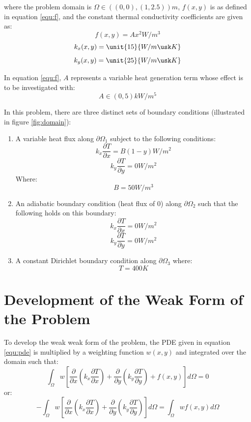 \documentclass[letterpaper,10pt]{article}
\begin{document}
\noindent where the problem domain is $\Omega \in \unit{\left(\left(0,0\right),\left(1,2.5\right)\right)}{m}$, $f(x,y)$ is as defined in equation \ref{equ:f}, and the constant thermal conductivity coefficients are given as:
\begin{equation}
\label{equ:f}
f(x,y) = Ax^2 \unit{}{W/m^3}
\end{equation}
\[k_x(x,y)=\unit{15}{W/m\usk K}\]
\[k_y(x,y)=\unit{25}{W/m\usk K}\]

\noindent In equation \ref{equ:f}, $A$ represents a variable heat generation term whose effect is to be investigated with:
\[A \in \unit{(0, 5)}{kW/m^5}\]

\noindent In this problem, there are three distinct sets of boundary conditions (illustrated in figure \ref{fig:domain}):
\begin{enumerate}
	\item A variable heat flux along $\partial \Omega_1$ subject to the following conditions:
	\[k_x\frac{\partial T}{\partial x} = B \left(1-y\right) \unit{}{W/m^2}\]
	\[k_y\frac{\partial T}{\partial y} = 0 \unit{}{W/m^2}\]
	Where:
	\[B = \unit{50}{W/m^3}\]
	
	\item An adiabatic boundary condition (heat flux of 0) along $\partial \Omega_2$ such that the following holds on this boundary:
	\[k_x\frac{\partial T}{\partial x} = 0 \unit{}{W/m^2}\]
	\[k_y\frac{\partial T}{\partial y} = 0 \unit{}{W/m^2}\]
	
	\item A constant Dirichlet boundary condition along $\partial \Omega_3$ where:
	\[T = \unit{400}{K}\]
\end{enumerate}

\section{Development of the Weak Form of the Problem}
To develop the weak weak form of the problem, the PDE given in equation \ref{equ:pde} is multiplied by a weighting function $w(x,y)$ and integrated over the domain such that:
\[\int_\Omega w \left[\frac{\partial}{\partial x}\left(k_x\frac{\partial T}{\partial x}\right) + \frac{\partial}{\partial y}\left(k_y\frac{\partial T}{\partial y}\right) + f(x,y)\right] d\Omega = 0\]
\noindent or:
\begin{equation}
\label{equ:wintpde}
-\int_\Omega w \left[\frac{\partial}{\partial x}\left(k_x\frac{\partial T}{\partial x}\right) + \frac{\partial}{\partial y}\left(k_y\frac{\partial T}{\partial y}\right)\right] d\Omega = \int_\Omega wf(x,y)d\Omega
\end{equation}
\end{document}
